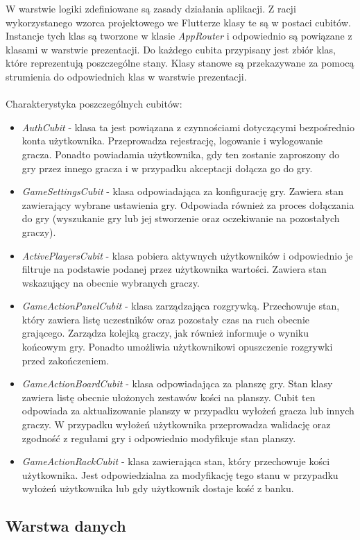 W warstwie logiki zdefiniowane są zasady działania aplikacji. Z racji wykorzystanego wzorca projektowego we Flutterze klasy te są w postaci cubitów. Instancje tych klas są tworzone w klasie \emph{AppRouter} i odpowiednio są powiązane z klasami w warstwie prezentacji. Do każdego cubita przypisany jest zbiór klas, które reprezentują poszczególne stany. Klasy stanowe są przekazywane za pomocą strumienia do odpowiednich klas w warstwie prezentacji. \\ \\
Charakterystyka poszczególnych cubitów:
\begin{itemize}
	\item \emph{AuthCubit} - klasa ta jest powiązana z czynnościami dotyczącymi bezpośrednio konta użytkownika. Przeprowadza rejestrację, logowanie i wylogowanie gracza. Ponadto powiadamia użytkownika, gdy ten zostanie zaproszony do gry przez innego gracza i w przypadku akceptacji dołącza go do gry.
	\item \emph{GameSettingsCubit} - klasa odpowiadająca za konfigurację gry. Zawiera stan zawierający wybrane ustawienia gry. Odpowiada również za proces dołączania do gry (wyszukanie gry lub jej stworzenie oraz oczekiwanie na pozostałych graczy).
	\item \emph{ActivePlayersCubit} - klasa pobiera aktywnych użytkowników i odpowiednio je filtruje na podstawie podanej przez użytkownika wartości. Zawiera stan wskazujący na obecnie wybranych graczy.
	\item \emph{GameActionPanelCubit} - klasa zarządzająca rozgrywką. Przechowuje stan, który zawiera listę uczestników oraz pozostały czas na ruch obecnie grającego. Zarządza kolejką graczy, jak również informuje o wyniku końcowym gry. Ponadto umożliwia użytkownikowi opuszczenie rozgrywki przed zakończeniem.
	\item \emph{GameActionBoardCubit} - klasa odpowiadająca za planszę gry. Stan klasy zawiera listę obecnie ułożonych zestawów kości na planszy. Cubit ten odpowiada za aktualizowanie planszy w przypadku wyłożeń gracza lub innych graczy. W przypadku wyłożeń użytkownika przeprowadza walidację oraz zgodność z regułami gry i odpowiednio modyfikuje stan planszy.
	\item \emph{GameActionRackCubit} - klasa zawierająca stan, który przechowuje kości użytkownika. Jest odpowiedzialna za modyfikację tego stanu w przypadku wyłożeń użytkownika lub gdy użytkownik dostaje kość z banku.
\end{itemize}

\subsection{Warstwa danych}

